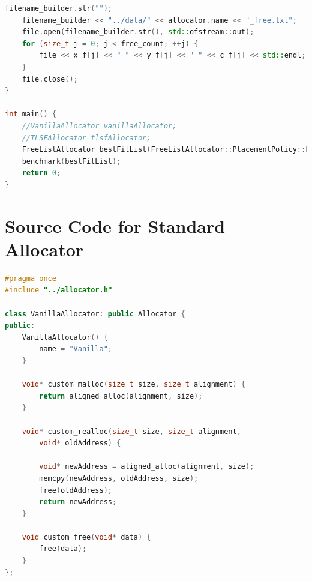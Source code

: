 \documentclass{article}
\begin{document}
\begin{appendices}
\begin{lstlisting}[language=C++]
	filename_builder.str("");
	filename_builder << "../data/" << allocator.name << "_free.txt";
	file.open(filename_builder.str(), std::ofstream::out);
	for (size_t j = 0; j < free_count; ++j) {
		file << x_f[j] << " " << y_f[j] << " " << c_f[j] << std::endl;
	}
	file.close();
}
	
int main() {
	//VanillaAllocator vanillaAllocator;
	//TLSFAllocator tlsfAllocator;
	FreeListAllocator bestFitList(FreeListAllocator::PlacementPolicy::FIND_BEST);
	benchmark(bestFitList);
	return 0;
}
	\end{lstlisting}
	\pagebreak
	\section[B ]{Source Code for Standard Allocator}
\begin{lstlisting}[language=C++]
#pragma once
#include "../allocator.h"

class VanillaAllocator: public Allocator {
public:
	VanillaAllocator() {
		name = "Vanilla";
	}
	
	void* custom_malloc(size_t size, size_t alignment) {
		return aligned_alloc(alignment, size);
	}
	
	void* custom_realloc(size_t size, size_t alignment, 
		void* oldAddress) {
			
		void* newAddress = aligned_alloc(alignment, size);
		memcpy(newAddress, oldAddress, size);
		free(oldAddress);
		return newAddress;
	}
	
	void custom_free(void* data) {
		free(data);
	}
};
\end{lstlisting}
\end{appendices}
\end{document}
